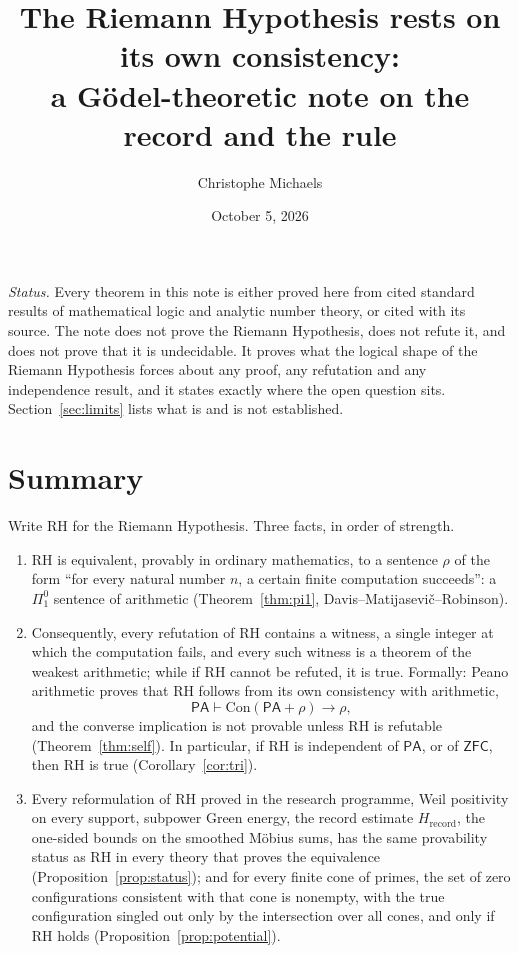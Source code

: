\documentclass[11pt]{article}
\title{The Riemann Hypothesis rests on its own consistency:\\ a G\"odel-theoretic note on the record and the rule}
\author{Christophe Michaels}
\date{October 5, 2026}
\theoremstyle{definition}
\theoremstyle{remark}
\newcommand{\PA}{\mathsf{PA}}
\newcommand{\ZFC}{\mathsf{ZFC}}
\newcommand{\Con}{\mathrm{Con}}
\newcommand{\RH}{\mathrm{RH}}
\newcommand{\Pione}{\Pi^0_1}
\begin{document}
\maketitle

\noindent\emph{Status.} Every theorem in this note is either proved here from cited standard results of mathematical logic and analytic number theory, or cited with its source. The note does not prove the Riemann Hypothesis, does not refute it, and does not prove that it is undecidable. It proves what the logical shape of the Riemann Hypothesis forces about any proof, any refutation and any independence result, and it states exactly where the open question sits. Section~\ref{sec:limits} lists what is and is not established.

\section*{Summary}

Write $\RH$ for the Riemann Hypothesis. Three facts, in order of strength.

\begin{enumerate}
\item $\RH$ is equivalent, provably in ordinary mathematics, to a sentence $\rho$ of the form ``for every natural number $n$, a certain finite computation succeeds'': a $\Pione$ sentence of arithmetic (Theorem~\ref{thm:pi1}, Davis--Matijasevi\v{c}--Robinson).
\item Consequently, every refutation of $\RH$ contains a witness, a single integer at which the computation fails, and every such witness is a theorem of the weakest arithmetic; while if $\RH$ cannot be refuted, it is true. Formally: Peano arithmetic proves that $\RH$ follows from its own consistency with arithmetic,
\[
\PA\vdash \Con(\PA+\rho)\to\rho ,
\]
and the converse implication is not provable unless $\RH$ is refutable (Theorem~\ref{thm:self}). In particular, if $\RH$ is independent of $\PA$, or of $\ZFC$, then $\RH$ is true (Corollary~\ref{cor:tri}).
\item Every reformulation of $\RH$ proved in the research programme, Weil positivity on every support, subpower Green energy, the record estimate $H_{\mathrm{record}}$, the one-sided bounds on the smoothed M\"obius sums, has the same provability status as $\RH$ in every theory that proves the equivalence (Proposition~\ref{prop:status}); and for every finite cone of primes, the set of zero configurations consistent with that cone is nonempty, with the true configuration singled out only by the intersection over all cones, and only if $\RH$ holds (Proposition~\ref{prop:potential}).
\end{enumerate}
\end{document}
